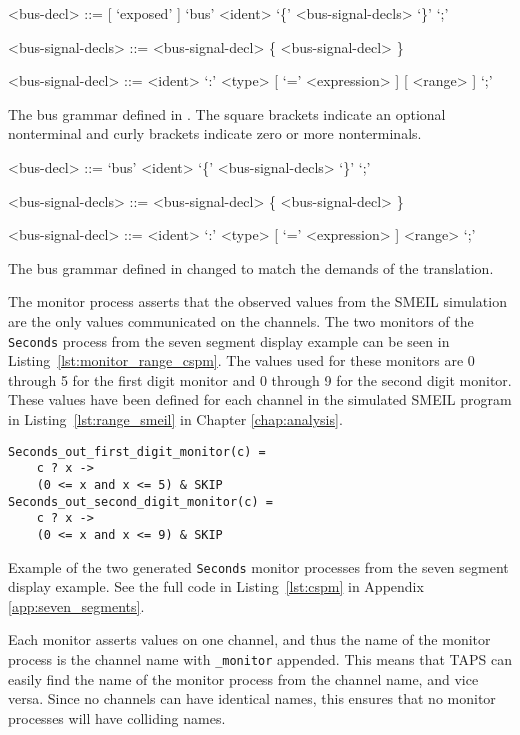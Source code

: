\begin{listing}
    \begin{grammar}
    <bus-decl> ::= [ `exposed' ] `bus' <ident> `\{' <bus-signal-decls> `\}'  `;'

    <bus-signal-decls> ::= <bus-signal-decl> \{ <bus-signal-decl> \}

    <bus-signal-decl> ::= <ident> `:' <type> [ `=' <expression> ] [ <range> ] `;'
    \end{grammar}
    \caption{The bus grammar defined in \cite{Asheim2018}. The square brackets indicate an optional nonterminal and curly brackets indicate zero or more nonterminals.}
    \label{lst:smeil_bus_grammar}
\end{listing}
\begin{listing}
    \begin{grammar}
    <bus-decl> ::= `bus' <ident> `\{' <bus-signal-decls> `\}'  `;'

    <bus-signal-decls> ::= <bus-signal-decl> \{ <bus-signal-decl> \}

    <bus-signal-decl> ::= <ident> `:' <type> [ `=' <expression> ] <range> `;'
    \end{grammar}
    \caption{The bus grammar defined in \cite{Asheim2018} changed to match the demands of the translation.}
    \label{lst:smeil_bus_grammar_no_option}
\end{listing}
The monitor process asserts that the observed values from the SMEIL simulation are the only values communicated on the channels. The two monitors of the \texttt{Seconds} process from the seven segment display example can be seen in Listing~\ref{lst:monitor_range_cspm}. The values used for these monitors are 0 through 5 for the first digit monitor and 0 through 9 for the second digit monitor. These values have been defined for each channel in the simulated SMEIL program in Listing~\ref{lst:range_smeil} in Chapter \ref{chap:analysis}.
\begin{listing}
\begin{verbatim}
Seconds_out_first_digit_monitor(c) =
    c ? x ->
    (0 <= x and x <= 5) & SKIP
Seconds_out_second_digit_monitor(c) =
    c ? x ->
    (0 <= x and x <= 9) & SKIP
\end{verbatim}
\caption{Example of the two generated \texttt{Seconds} monitor processes from the seven segment display example. See the full code in Listing~\ref{lst:cspm} in Appendix \ref{app:seven_segments}.}
\label{lst:monitor_range_cspm}
\end{listing}
Each monitor asserts values on one channel, and thus the name of the monitor process is the channel name with \texttt{\_monitor} appended. This means that TAPS can easily find the name of the monitor process from the channel name, and vice versa.
Since no \cspm{} channels can have identical names, this ensures that no monitor processes will have colliding names.\\

